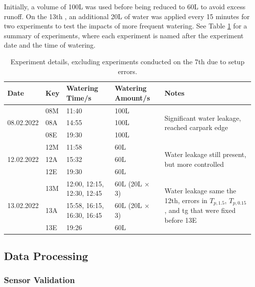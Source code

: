 \documentclass[final,3p,times,authoryear]{elsarticle}
\begin{document}
Initially, a volume of 100L was used before being reduced to 60L to avoid excess runoff. On the 13th , an additional 20L of water was applied every 15 minutes for two experiments to test the impacts of more frequent watering. See Table \ref{table:2.2} for a summary of experiments, where each experiment is named after the experiment date and the time of watering.

\begin{table}[!ht]\caption{Experiment details, excluding experiments conducted on the 7th due to setup errors.}
    \centering
    \begin{tabular}{|p{2.0cm}|p{3cm}|p{2.0cm}|p{2.0cm}|p{5cm}|}
    \hline
        Date & Key & Watering Time/s & Watering Amount/s & Notes \\ \hline
        \multirow{3}{2pt}{08.02.2022} & 08M & 11:40 & 100L & \multirow{3}{*}{\parbox{4cm}{Significant water leakage, reached carpark edge}} \\
         ~ & 08A & 14:55 & 100L & ~ \\ 
         ~ & 08E & 19:30 & 100L & ~ \\ \hline
         \multirow{3}{2pt}{12.02.2022} & 12M & 11:58 & 60L & \multirow{3}{*}{\parbox{4cm}{Water leakage still present, but more controlled}} \\
          ~ & 12A & 15:32 & 60L & ~ \\ 
          ~ & 12E & 19:30 & 60L & ~ \\ \hline
        \multirow{3}{2pt}{13.02.2022} & 13M & 12:00, 12:15, 12:30, 12:45 & 60L (20L $\times$ 3) & \multirow{3}{*}{\parbox{4cm}{Water leakage same the 12th, errors in $T_{p,1.5}$, $T_{p,0.15}$, and \gls{tg} that were fixed before 13E}} \\
         ~ & 13A & 15:58, 16:15, 16:30, 16:45 & 60L (20L $\times$ 3) & ~ \\ 
         ~ & 13E & 19:26 & 60L & ~ \\ \hline
    \end{tabular}\label{table:2.2}
\end{table}

\subsection{Data Processing}\label{sec:methods2.2}
\subsubsection{Sensor Validation}\label{sec:methods2.2.1}
\end{document}
